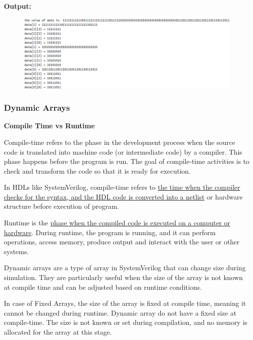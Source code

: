 \documentclass[12pt, a4paper]{article}
\begin{document}
\textbf{Output:}
\vspace{-0.5em}
\begin{figure}[H]
    \centering
    \includegraphics[width=1\textwidth]{Packed_Output.png}
\end{figure}

\subsubsection{Dynamic Arrays}

\textbf{Compile Time vs Runtime}

Compile-time refers to the phase in the development process when the source code is translated into machine code (or intermediate code) by a compiler. This phase happens before the program is run. The goal of compile-time activities is to check and transform the code so that it is ready for execution.

\vspace{0.5em}

In HDLs like SystemVerilog, compile-time refers to \ul{the time when the compiler checks for the syntax, and the HDL code is converted into a netlist} or hardware structure before execution of program.

\vspace{0.5em}

Runtime is the \ul{phase when the compiled code is executed on a computer or hardware}. During runtime, the program is running, and it can perform operations, access memory, produce output and interact with the user or other systems.

\vspace{1em}

Dynamic arrays are a type of array in SystemVerilog that can change size during simulation. They are particularly useful when the size of the array is not known at compile time and can be adjusted based on runtime conditions.

In case of Fixed Arrays, the size of the array is fixed at compile time, meaning it cannot be changed during runtime. Dynamic array do not have a fixed size at compile-time. The size is not known or set during compilation, and no memory is allocated for the array at this stage.
\end{document}

